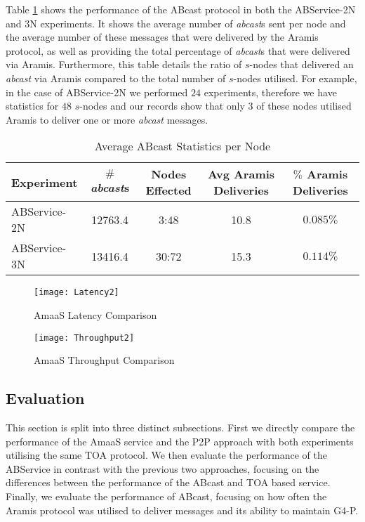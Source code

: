     Table \ref{table:emulated_transcation_aramis_deliveries} shows the performance of the \textsf{ABcast} protocol in both the ABService-2N and 3N experiments.  It shows the average number of \emph{abcast}s sent per node and the average number of these messages that were delivered by the Aramis protocol, as well as providing the total percentage of \emph{abcast}s that were delivered via Aramis.  Furthermore, this table details the ratio of $s$-nodes that delivered an \emph{abcast} via Aramis compared to the total number of $s$-nodes utilised.  For example, in the case of ABService-2N we performed $24$ experiments, therefore we have statistics for $48$ $s$-nodes and our records show that only $3$ of these nodes utilised Aramis to deliver one or more \emph{abcast} messages.  
	
	\begin{table}[h]
	  \begin{center}
	    \begin{tabular}{|l|c|c|c|c|}
	    \hline
	    Experiment  & $\#$ \emph{abcast}s & Nodes Effected &  Avg Aramis Deliveries & $\%$ Aramis Deliveries \\ \hline \hline
	    ABService-2N & 12763.4 & 3:48   & 10.8  & $0.085\%$  \\ \hline
	    ABService-3N & 13416.4 & 30:72 & 15.3  & $0.114\%$ \\ \hline
	    \end{tabular}
	    \caption{Average ABcast Statistics per Node}
	    \label{table:emulated_transcation_aramis_deliveries}
	  \end{center}
	\end{table}	
	
	\begin{figure}[h]
	 \texttt{[image: Latency2]}
	 \caption{AmaaS Latency Comparison}
	 \label{fig:LatencyGraph}
	\end{figure}
	
	\begin{figure}[h]
	 \texttt{[image: Throughput2]}
	 \caption{AmaaS Throughput Comparison}
	 \label{fig:ThroughputGraph}
	\end{figure}	
	
	\clearpage
    \subsection{Evaluation}
    This section is split into three distinct subsections.  First we directly compare the performance of the \textsf{AmaaS} service and the P2P approach with both experiments utilising the same TOA protocol.  We then evaluate the performance of the ABService in contrast with the previous two approaches, focusing on the differences between the performance of the ABcast and TOA based service.  Finally, we evaluate the performance of \textsf{ABcast}, focusing on how often the \textsf{Aramis} protocol was utilised to deliver messages and its ability to maintain G4-P.  
    
